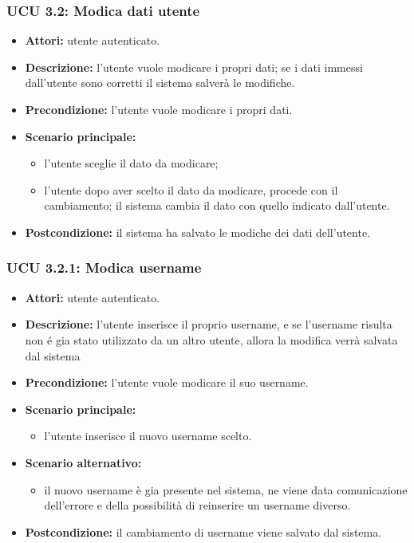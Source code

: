  
\subsubsection{UCU 3.2: Modica dati utente} %
\begin{itemize}
	\item \textbf{Attori: } utente autenticato.
	\item \textbf{Descrizione: } l'utente vuole modicare i propri dati; se i dati immessi dall'utente sono corretti il sistema salverà le modifiche.
	\item \textbf{Precondizione: } l'utente vuole modicare i propri dati.
	\item \textbf{Scenario principale:}
	\begin{itemize}
		\item l'utente sceglie il dato da modicare;
		\item l'utente dopo aver scelto il dato da modicare, procede con il cambiamento;
il sistema cambia il dato con quello indicato dall'utente.
	\end{itemize}
\item \textbf{Postcondizione:} il sistema ha salvato le modiche dei dati dell'utente.
\end{itemize}

\subsubsection{UCU 3.2.1: Modica username}
\begin{itemize}
	\item \textbf{Attori: } utente autenticato.
	\item \textbf{Descrizione: } l'utente inserisce il proprio username, e se l'username risulta non é gia stato utilizzato da un altro utente, allora la modifica verrà salvata dal sistema
	\item \textbf{Precondizione: } l'utente vuole modicare il suo username.
	\item \textbf{Scenario principale:}
	\begin{itemize}
		\item l'utente inserisce il nuovo username scelto.
	\end{itemize}
	\item \textbf{Scenario alternativo:}
	\begin{itemize}
		\item il nuovo username è gia presente nel sistema, ne viene data comunicazione dell'errore e della possibilità di reinserire un username diverso.
	\end{itemize}
\item \textbf{Postcondizione:} il cambiamento di username viene salvato dal sistema.
\end{itemize}

